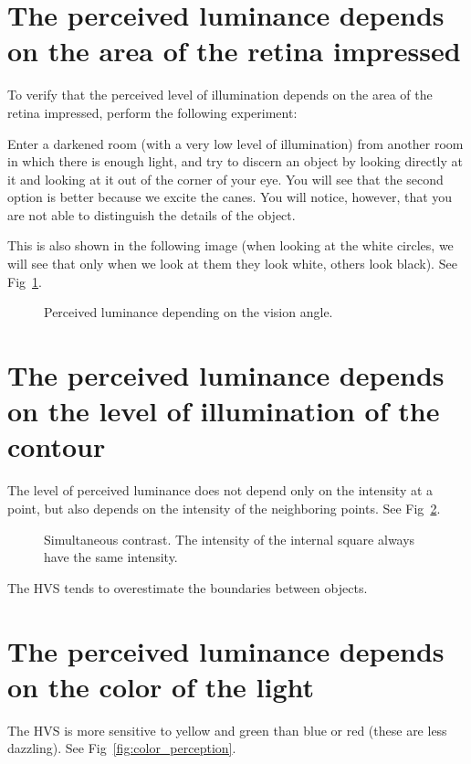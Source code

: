 \section{The perceived luminance depends on the area of the retina impressed}
To verify that the perceived level of illumination depends on the area
of the retina impressed, perform the following experiment:

Enter a darkened room (with a very low level of illumination) from another room in which there is enough light, and try to discern an object by looking directly at it and looking at it out of the corner of your eye. You will see that the second option is better because we excite the canes. You will notice, however, that you are not able to distinguish the details of the object.

This is also shown in the following image (when looking at the white circles, we will see that only when we look at them they look white, others look black). See Fig~\ref{fig:perceived_luminance_vs_angle}.

\begin{figure}
  \caption{Perceived luminance depending on the vision angle.} %
  \label{fig:perceived_luminance_vs_angle}
\end{figure}

\section{The perceived luminance depends on the level of illumination of the contour}

The level of perceived luminance does not depend only on the intensity at a point, but also depends on the intensity of the neighboring points. See Fig~\ref{fig:simultaneous_contrast}.

\begin{figure}
  \caption{Simultaneous contrast. The intensity of the internal square always have the same intensity.} %
  \label{fig:simultaneous_contrast}
\end{figure}

The HVS tends to overestimate the boundaries between objects.

\section{The perceived luminance depends on the color of the light}
The HVS is more sensitive to yellow and green than blue or red (these are less dazzling). See Fig~\ref{fig:color_perception}.

